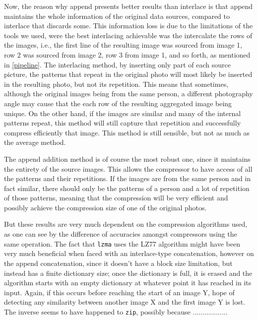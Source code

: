 \documentclass[12pt]{article}
\begin{document}
Now, the reason why append presents better results than interlace is that append maintains the whole information of the original data sources, compared to interlace that discards some. This information loss is due to the limitations of the tools we used, were the best interlacing achievable was the intercalate the rows of the images, i.e., the first line of the resulting image was sourced from image 1, row 2 was sourced from image 2, row 3 from image 1, and so forth, as mentioned in \ref{pipeline}. The interlacing method, by inserting only part of each source picture, the patterns that repeat in the original photo will most likely be inserted in the resulting photo, but not its repetition. This means that sometimes, although the original images being from the same person, a different photography angle may cause that the each row of the resulting aggregated image being unique. On the other hand, if the images are similar and many of the internal patterns repeat, this method will still capture that repetition and successfully compress efficiently that image. This method is still sensible, but not as much as the average method.

The append addition method is of course the most robust one, since it maintains the entirety of the source images. This allows the compressor to have access of all the patterns and their repetitions. If the images are from the same person and in fact similar, there should only be the patterns of a person and a lot of repetition of those patterns, meaning that the compression will be very efficient and possibly achieve the compression size of one of the original photos.

But these results are very much dependent on the compression algorithms used, as one can see by the difference of accuracies amongst compressors using the same operation.  The fact that \texttt{lzma} uses the LZ77 algorithm might have been very much beneficial when faced with an interlace-type concatenation, however on the append concatenation, since it doesn’t have a block size limitation, but instead has a finite dictionary size; once the dictionary is full, it is erased and the algorithm starts with an empty dictionary at whatever point it has reached in its input. Again, if this occurs before reaching the start of an image Y, hope of detecting any similarity between another image X and the first image Y is lost\cite{lzmaExplanation}.
The inverse seems to have happened to \texttt{zip}, possibly because ..................
\end{document}
